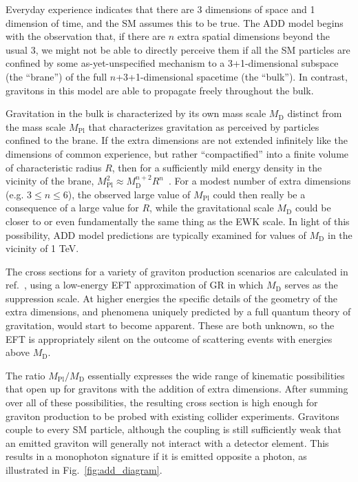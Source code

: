 \documentclass[oneside, letterpaper, 12pt, oldfontcommands]{memoir}
\begin{document}
Everyday experience indicates that there are 3 dimensions of space and 1 dimension of time, and the SM assumes this to be true.
The ADD model begins with the observation that, if there are $n$ extra spatial dimensions beyond the usual 3,
we might not be able to directly perceive them if all the SM particles are confined by some as-yet-unspecified
mechanism to a 3+1-dimensional subspace (the ``brane'') of the full $n$+3+1-dimensional spacetime (the ``bulk'').
In contrast, gravitons in this model are able to propagate freely throughout the bulk.

Gravitation in the bulk is characterized by its own mass scale $M_\mathrm{D}$ distinct from the mass scale $M_\mathrm{Pl}$ that
characterizes gravitation as perceived by particles confined to the brane. If the extra dimensions are not extended infinitely like the
dimensions of common experience, but rather ``compactified'' into a finite volume of characteristic radius $R$, then for a sufficiently mild
energy density in the vicinity of the brane, $M_\mathrm{Pl}^{2} \approx M_\mathrm{D}^{n+2} R^{n}$~\cite{ref:S0370-2693(98)00466-3, ref:S0550-3213(99)00044-9}.
For a modest number of extra dimensions (e.g. $3 \leq n \leq 6$), the observed large value of $M_\mathrm{Pl}$ could then really
be a consequence of a large value for $R$, while the gravitational scale $M_\mathrm{D}$ could be closer to or even
fundamentally the same thing as the EWK scale. In light of this possibility, ADD model predictions
are typically examined for values of $M_\mathrm{D}$ in the vicinity of 1 TeV.

The cross sections for a variety of graviton production scenarios are calculated in ref.~\cite{ref:S0550-3213(99)00044-9}, using a low-energy EFT
approximation of GR in which $M_\mathrm{D}$ serves as the suppression scale. At higher energies the specific details of the geometry of the extra dimensions,
and phenomena uniquely predicted by a full quantum theory of gravitation, would start to become apparent. These are both unknown, so the EFT
is appropriately silent on the outcome of scattering events with energies above $M_\mathrm{D}$.

The ratio $M_\mathrm{Pl} / M_\mathrm{D}$ essentially expresses the wide range of kinematic possibilities that open up for gravitons with the addition
of extra dimensions. After summing over all of these possibilities, the resulting
cross section is high enough for graviton production to be probed with existing collider experiments.
Gravitons couple to every SM particle, although the coupling is still sufficiently weak that an emitted graviton will generally not interact with a detector element.
This results in a monophoton signature if it is emitted opposite a photon, as illustrated in Fig.~\ref{fig:add_diagram}.
\end{document}
